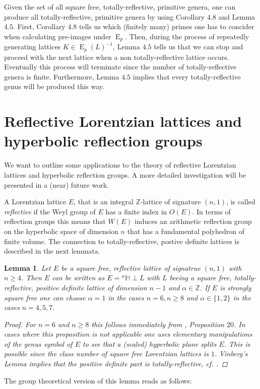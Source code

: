 \documentclass{amsart}
\newtheorem{lem}[thm]{Lemma}
\theoremstyle{definition}
\theoremstyle{remark}
\def\ZZ{\mathbb{Z}}
\DeclareMathOperator{\E}{E}
\begin{document}
Given the set of all square free, totally-reflective, primitive genera, one can produce all totally-reflective, primitive genera by using Corollary $4.8$ and Lemma $4.5$.
First, Corollary $4.8$ tells us which (finitely many) primes one has to concider when calculating pre-images under $\E_p$. Then, during the process of repeatedly generating 
lattices $K \in \E_p(L)^{-1}$, Lemma $4.5$ tells us that we can stop and proceed with the next lattice when a non totally-reflective lattice occurs. Eventually this process will terminate
since the number of totally-reflective genera is finite. Furthermore, Lemma $4.5$ implies that every totally-reflective genus will be produced this way.

\section{Reflective Lorentzian lattices and hyperbolic reflection groups}
We want to outline some applications to the theory of reflective Lorentzian lattices and hyperbolic reflection groups. A more detailed investigation will be presented in a (near) future work.

A Lorentzian lattice $E$, that is an integral $\ZZ$-lattice of signature $(n,1)$, is called \emph{reflective} if the Weyl group of $E$ has a finite index in $O(E)$. In terms of reflection groups this 
means that $W(E)$ induces an arithmetic reflection group on the hyperbolic space of dimension $n$ that has a fundamental polyhedron of finite volume. The connection to totally-reflective, 
postive definite lattices is described in the next lemmata.

\begin{lem}
Let $E$ be a square free, reflective lattice of signatrue $(n,1)$ with $n \geq 4$. Then $E$ can be written as $E = {}^{\alpha}\!{\mathbb{H}} \perp L$
with $L$ beeing a square free, totally-reflective, positive definite lattice of dimension $n-1$ and $\alpha \in \ZZ$. If $E$ is strongly square free one can choose $ \alpha = 1$ in the cases $n = 6, n \geq 8$
and $\alpha \in \{1,2\}$ in the cases $n=4,5,7$.
 \begin{proof}
   For $n = 6$ and $n \geq 8$ this follows immediately from \cite{vin81}, Proposition $20$. In cases where this proposition is not applicable one uses elementary manipulations of the genus symbol of $E$
   to see that a (scaled) hyperbolic plane splits $E$. This is possible since the class number of square free Lorentzian lattices is $1$. 
   Vinberg's Lemma implies that the positive definite part is totally-reflective, cf. \cite{vin72}.
 \end{proof}
\end{lem}
The group theoretical version of this lemma reads as follows:
\end{document}
